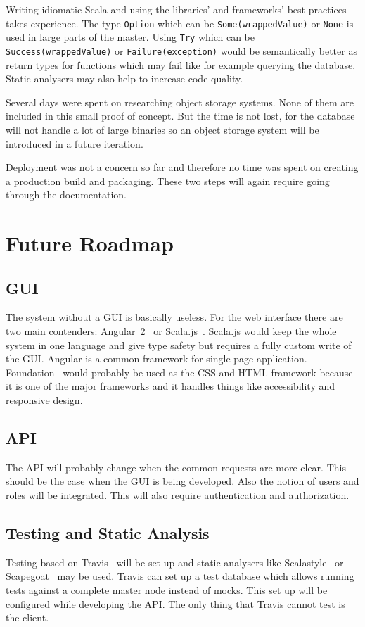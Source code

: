 \documentclass[a4paper,twocolumn,twoside]{article}
\begin{document}
Writing idiomatic Scala and using the libraries' and frameworks' best practices takes experience.
The type \texttt{Option} which can be \texttt{Some(wrappedValue)} or \texttt{None} is used in large parts of the master.
Using \texttt{Try} which can be \texttt{Success(wrappedValue)} or \texttt{Failure(exception)} would be semantically better as return types for functions which may fail like for example querying the database.
Static analysers may also help to increase code quality.

Several days were spent on researching object storage systems.
None of them are included in this small proof of concept.
But the time is not lost, for the database will not handle a lot of large binaries so
an object storage system will be introduced in a future iteration.

Deployment was not a concern so far and therefore no time was spent on creating a production build and packaging.
These two steps will again require going through the documentation.



\section{Future Roadmap}

\subsection*{GUI}
The system without a GUI is basically useless.
For the web interface there are two main contenders: Angular~2~\cite{Angular2} or Scala.js~\cite{ScalaJs}.
Scala.js would keep the whole system in one language and give type safety but requires a fully custom write of the GUI.
Angular is a common framework for single page application.
Foundation~\cite{Foundation} would probably be used as the CSS and HTML framework 
because it is one of the major frameworks and it handles things like accessibility and responsive design.

\subsection*{API}
The API will probably change when the common requests are more clear.
This should be the case when the GUI is being developed.
Also the notion of users and roles will be integrated.
This will also require authentication and authorization.

\subsection*{Testing and Static Analysis}
Testing based on Travis~\cite{Travis} will be set up and static analysers like Scalastyle~\cite{Scalastyle} or Scapegoat~\cite{Scapegoat} may be used.
Travis can set up a test database which allows running tests against a complete master node instead of mocks.
This set up will be configured while developing the API.
The only thing that Travis cannot test is the client.
\end{document}

